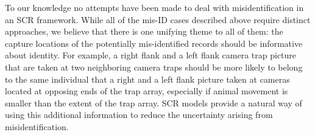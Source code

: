 To our knowledge no attempts have been made to deal with
misidentification in an SCR framework. While all of the mis-ID cases
described above require distinct approaches, we believe that there is
one unifying theme to all of them: the capture locations of the %
potentially mis-identified records
should be informative about identity.
For example, a right flank and a left flank camera trap
picture that are taken at two neighboring camera traps
should be %
more likely
to belong to the same individual that a right and a left flank picture
taken at cameras located at opposing ends of the trap array, especially if
animal movement is smaller than the extent of the trap array. %
SCR models provide a natural way of using this additional information
to reduce the uncertainty arising from misidentification.

